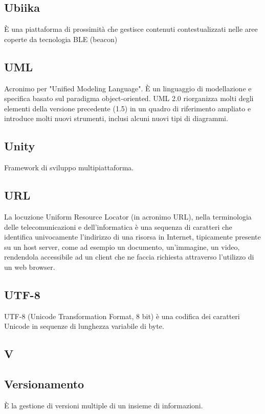 \subsection*{Ubiika}
È una piattaforma di prossimità che gestisce contenuti contestualizzati nelle
aree coperte da tecnologia BLE (beacon)​

\subsection*{UML}
Acronimo per "Unified Modeling Language". È un linguaggio di modellazione e
specifica basato sul paradigma object-oriented. UML 2.0 riorganizza molti degli
elementi della versione precedente (1.5) in un quadro di riferimento ampliato e
introduce molti nuovi strumenti, inclusi alcuni nuovi tipi di diagrammi.

\subsection*{Unity}
Framework di sviluppo multipiattaforma.

\subsection*{URL}
La locuzione Uniform Resource Locator (in acronimo URL), nella terminologia delle telecomunicazioni e dell'informatica è una sequenza di caratteri che identifica univocamente l'indirizzo di una risorsa in Internet, tipicamente presente su un host server, come ad esempio un documento, un'immagine, un video, rendendola accessibile ad un client che ne faccia richiesta attraverso l'utilizzo di un web browser.

\subsection*{UTF-8}
UTF-8 (Unicode Transformation Format, 8 bit) è una codifica dei caratteri Unicode in sequenze di lunghezza variabile di byte.

\newpage

\begin{center}
\Huge\section*{\uppercase{V}}
\end{center}

\subsection*{Versionamento}
È la gestione di versioni multiple di un insieme di informazioni.

